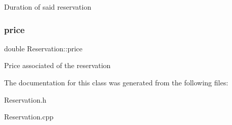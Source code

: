 Duration of said reservation \mbox{\label{class_reservation_a82e197bd30e7949ee9b8616ee4eacf83}} 
\subsubsection{\texorpdfstring{price}{price}}
{\footnotesize\ttfamily double Reservation\+::price\hspace{0.3cm}{\ttfamily [protected]}}

Price associated of the reservation 

The documentation for this class was generated from the following files\+:\begin{DoxyCompactItemize}
\item 
Reservation.\+h\item 
Reservation.\+cpp\end{DoxyCompactItemize}
